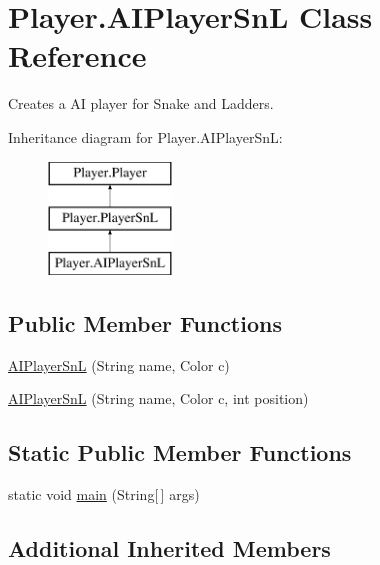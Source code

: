\hypertarget{class_player_1_1_a_i_player_sn_l}{}\section{Player.\+A\+I\+Player\+Sn\+L Class Reference}
\label{class_player_1_1_a_i_player_sn_l}


Creates a A\+I player for Snake and Ladders.  


Inheritance diagram for Player.\+A\+I\+Player\+Sn\+L\+:\begin{figure}[H]
\begin{center}
\leavevmode
\includegraphics[height=3.000000cm]{class_player_1_1_a_i_player_sn_l}
\end{center}
\end{figure}
\subsection*{Public Member Functions}
\begin{DoxyCompactItemize}
\item 
\hyperlink{class_player_1_1_a_i_player_sn_l_a6925c3a7d1b9ec60814a81770d013909}{A\+I\+Player\+Sn\+L} (String name, Color c)
\item 
\hyperlink{class_player_1_1_a_i_player_sn_l_af70de8501407cb1a81c609a571155d35}{A\+I\+Player\+Sn\+L} (String name, Color c, int position)
\end{DoxyCompactItemize}
\subsection*{Static Public Member Functions}
\begin{DoxyCompactItemize}
\item 
static void \hyperlink{class_player_1_1_a_i_player_sn_l_addf8c57621626f61e1415d2b945b5eff}{main} (String\mbox{[}$\,$\mbox{]} args)
\end{DoxyCompactItemize}
\subsection*{Additional Inherited Members}


